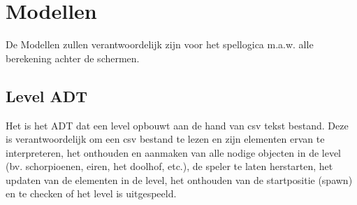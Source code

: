 \section{Modellen}
\label{model}
De Modellen zullen verantwoordelijk zijn voor het spellogica m.a.w. alle berekening achter de schermen.

\subsection{Level ADT}
\label{section:level}
Het \texttt{} is het ADT dat een level opbouwt aan de hand van csv tekst bestand.
Deze is verantwoordelijk om
een csv bestand te lezen en zijn elementen ervan te interpreteren,
het onthouden en aanmaken van alle nodige objecten in de level (bv. schorpioenen, eiren, het doolhof, etc.),
de speler te laten herstarten,
het updaten van de elementen in de level,
het onthouden van de startpositie (spawn)
en te checken of het level is uitgespeeld.

